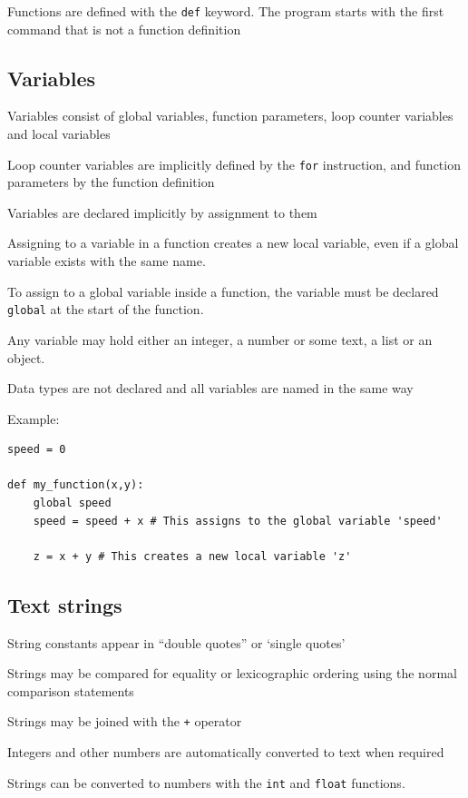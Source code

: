 \documentclass[12pt,a4paper,twoside]{article}
\renewcommand{\_}{\texttt{\symbol{95}}}
\begin{document}
Functions are defined with the \verb^def^ keyword. The program starts with the first command that is not a function
definition

\subsection{Variables}

\begin{bulletlist}
\item Variables consist of global variables, function parameters,
	loop counter variables and local variables
\item Loop counter variables are implicitly defined by the \verb^for^
	instruction, and function parameters by the function definition
\item Variables are declared implicitly by assignment to them
\item Assigning to a variable in a function creates a new local variable,
    even if a global variable exists with the same name.
\item To assign to a global variable inside a function, the variable must
    be declared \verb^global^ at the start of the function.
\item Any variable may hold either an integer, a number or some text, a list or an object.
\item Data types are not declared and all variables are named in the same way
\end{bulletlist}

Example:
\begin{verbatim}
speed = 0

def my_function(x,y):
    global speed
    speed = speed + x # This assigns to the global variable 'speed'

    z = x + y # This creates a new local variable 'z'

\end{verbatim}

\subsection{Text strings}

\begin{bulletlist}
\item String constants appear in ``double quotes'' or `single quotes'
\item Strings may be compared for equality or lexicographic ordering
	using the normal comparison statements
\item Strings may be joined with the \verb^+^ operator
\item Integers and other numbers are automatically converted to text
	when required
\item Strings can be converted to numbers with the \verb^int^ and \verb^float^ functions.
\end{bulletlist}
\end{document}
